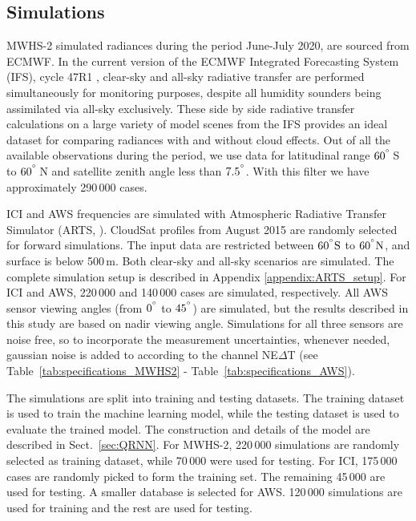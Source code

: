 \documentclass[amt, manuscript]{copernicus}
\begin{document}
\subsection{Simulations}
%
MWHS-2 simulated radiances during the period June-July 2020, are sourced from ECMWF. In the current version of the ECMWF Integrated Forecasting System (IFS), cycle 47R1 \citep{IFS47R1chap1}, clear-sky and all-sky radiative transfer are performed simultaneously for monitoring purposes, despite all humidity sounders being assimilated via all-sky exclusively. These side by side radiative transfer calculations on a large variety of model scenes from the IFS provides an ideal dataset for comparing radiances with and without cloud effects. Out of all the available observations during the period, we use data for latitudinal range $60^{^{\circ}}$\,S to $60^{^{\circ}}$\,N and satellite zenith angle less than $7.5^{^{\circ}}$. With this filter we have approximately 290\,000 cases.

ICI and AWS frequencies are simulated with Atmospheric Radiative Transfer Simulator (ARTS, \citet{buehler:artst:18}). CloudSat\citep{Stephens2002cloudsat} profiles from August 2015 are randomly selected for forward simulations. The input data are restricted between $60\unit{^{\degree}S}$ to $60\unit{^{\degree}N}$, and surface is below 500\,m. Both clear-sky and all-sky scenarios  are simulated. The complete simulation setup is described in Appendix \ref{appendix:ARTS_setup}. For ICI and AWS, 220\,000 and 140\,000 cases are simulated, respectively. All AWS sensor viewing angles (from $0^{^{\circ}}$ to $45^{^{\circ}}$) are simulated, but the results described in this study are based on nadir viewing angle. Simulations for all three sensors are noise free, so to incorporate the measurement uncertainties, whenever needed, gaussian noise is added to according to the channel NE$\Delta$T (see Table~\ref{tab:specifications_MWHS2} - Table~\ref{tab:specifications_AWS}). 

The simulations are split into training and testing datasets. The training dataset is used to train the machine learning model, while the testing dataset is used to evaluate the trained model. The construction and details of the model are described in Sect.~\ref{sec:QRNN}. For MWHS-2, 220\,000 simulations are randomly selected as training dataset, while 70\,000 were used for testing. For ICI, 175\,000 cases are randomly picked to form the training set. The remaining 45\,000 are used for testing. A smaller database is selected for AWS. 120\,000 simulations are used for training and the rest are used for testing.
\end{document}

